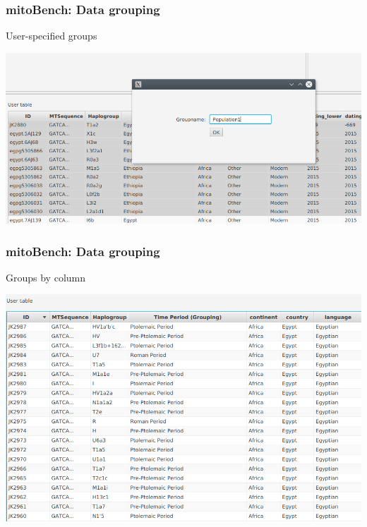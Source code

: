 \documentclass{beamer} %
\begin{document}
\begin{frame}
	\frametitle{mitoBench: Data grouping}
	User-specified groups
	\begin{center}
		\includegraphics[scale=0.45]{imagesBench/group_user.png}
	\end{center}
\end{frame}



\begin{frame}
\frametitle{mitoBench: Data grouping}
Groups by column
\begin{center}
	\includegraphics[scale=0.4]{imagesBench/grouping_by_column.png}
\end{center}
\end{frame}
\end{document}

